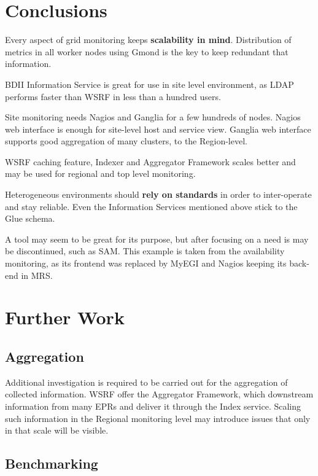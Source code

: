 \section{Conclusions}

Every aspect of grid monitoring keeps {\bf scalability in mind}. Distribution of metrics in all worker nodes using Gmond is the key to keep redundant that information.

BDII Information Service is great for use in site level environment, as LDAP performs faster than WSRF in less than a hundred users.

Site monitoring needs Nagios and Ganglia for a few hundreds of nodes. Nagios web interface is enough for site-level host and service view. Ganglia web interface supports good aggregation of many clusters, to the Region-level.

WSRF caching feature, Indexer and Aggregator Framework scales better and may be used for regional and top level monitoring.

Heterogeneous environments should {\bf rely on standards} in order to inter-operate and stay reliable. Even the Information Services mentioned above stick to the Glue schema.

A tool may seem to be great for its purpose, but after focusing on a need is may be discontinued, such as SAM. This example is taken from the availability monitoring, as its frontend was replaced by MyEGI and Nagios keeping its back-end in MRS.

\section{Further Work}

\subsection{Aggregation}

Additional investigation is required to be carried out for the aggregation of collected information. WSRF offer the Aggregator Framework, which downstream information from many EPRs and deliver it through the Index service. Scaling such information in the Regional monitoring level may introduce issues that only in that scale will be visible.

\subsection{Benchmarking}

